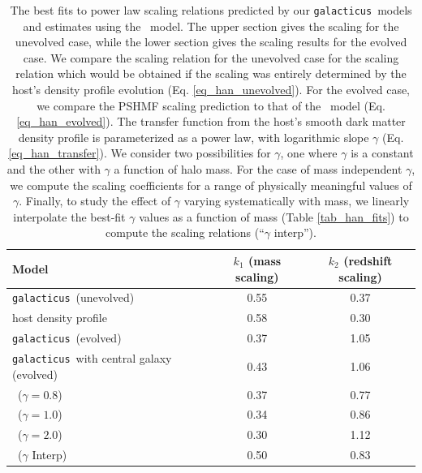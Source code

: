 \documentclass[%
 reprint,
 amsmath,
 amssymb,
 aps,
prd,
twocolumn,
superscriptaddress,
preprintnumbers,
floatfix,
nofootinbib
]{revtex4-2}
\def\gal{{\tt galacticus}~}
\def\hanetal{\citet{10.1093/mnras/stv2900}~}
\newcommand{\reftable}[1]{Table \ref{#1}}
\newcommand{\refeq}[1]{Eq. \ref{#1}}
\begin{document}
\begin{table}
 \begin{tabular}{lcc}
  \hline
    Model & $k_1$ (mass scaling) & $k_2$ (redshift scaling)\\
  \hline
        \gal (unevolved)                                             & 0.55 & 0.37   \\
    host density profile                                             & 0.58 & 0.30   \\
  \hline
        \gal (evolved)                                               & 0.37 & 1.05   \\
        \gal with central galaxy (evolved)                           & 0.43 & 1.06   \\  
        \hanetal ($\gamma = 0.8$)                                    & 0.37 & 0.77   \\
        \hanetal ($\gamma = 1.0$)                                    & 0.34 & 0.86   \\
        \hanetal ($\gamma = 2.0$)                                    & 0.30 & 1.12   \\
        \hanetal ($\gamma$ Interp)                                   & 0.50 & 0.83   \\
    \hline
 \end{tabular}
 \caption{
            The best fits to power law scaling relations predicted by our \gal models and estimates using the \hanetal model.
            The upper section gives the scaling for the unevolved case, while the lower section gives the scaling results for the evolved case.
            We compare the scaling relation for the unevolved case for the scaling relation which would be obtained if the scaling was entirely determined by the host's density profile evolution (\refeq{eq_han_unevolved}).
            For the evolved case, we compare the PSHMF scaling prediction to that of the \hanetal model (\refeq{eq_han_evolved}).
            The transfer function from the host's smooth dark matter density profile is parameterized as a power law, with logarithmic slope $\gamma$ (\refeq{eq_han_transfer}).
            We consider two possibilities for $\gamma$, one where $\gamma$ is a constant and the other with $\gamma$ a function of halo mass.
            For the case of mass independent $\gamma$, we compute the scaling coefficients for a range of physically meaningful values of $\gamma$.
            Finally, to study the effect of $\gamma$ varying systematically with mass, we linearly interpolate the best-fit $\gamma$ values as a function of mass (\reftable{tab_han_fits}) to compute the scaling relations (``$\gamma$ interp'').
           }
  \label{tab_scaling}
\end{table}
\end{document}
